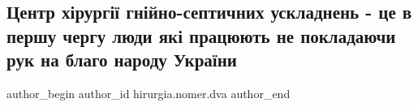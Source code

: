  
 
 
 
 

\subsection{Центр хірургії гнійно-септичних ускладнень - це в першу чергу люди які працюють не покладаючи рук на благо народу України}
\label{sec:03_11_2022.fb.hirurgia.nomer.dva.1.tsentr_kh_rurg__gn_}

\ifcmt
 author_begin
   author_id hirurgia.nomer.dva
 author_end
\fi
